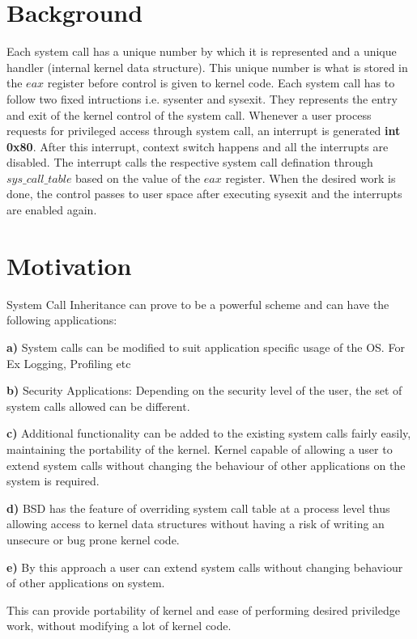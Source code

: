 \documentclass[11pt]{article}
\begin{document}
\section{Background}

Each system call has a unique number by which it is represented and a unique handler (internal kernel data structure).
This unique number is what is stored in the $eax$ register before control is given to kernel code. Each system call
has to follow two fixed intructions i.e. sysenter and sysexit. They represents the entry and exit of the kernel control
of the system call. Whenever a user process requests for privileged access through system call, an interrupt is
generated \textbf{int 0x80}. After this interrupt, context switch happens and all the interrupts are disabled.
The interrupt calls the respective system call defination through $sys\_call\_table$ based on the value of the $eax$
register. When the desired work is done, the control passes  to user space after executing sysexit and the
interrupts are enabled again.

\section{Motivation}

System Call Inheritance can prove to be a powerful scheme and can have the following applications: 

\medskip
\noindent
\textbf{a)} System calls can be modified to suit application specific usage of the OS. For Ex Logging, Profiling etc 

\noindent
\textbf{b)} Security Applications: Depending on the security level of the user, the set of system calls allowed can be different. 

\noindent
\textbf{c)} Additional functionality can be added to the existing system calls fairly easily, maintaining the portability of the kernel. Kernel capable of allowing a user to extend system calls without changing the behaviour of other applications on the system is required. 

\noindent
\textbf{d)} BSD has the feature of overriding system call table at a process level thus allowing access to kernel data structures without having a risk of writing an unsecure or bug prone kernel code. 

\noindent
\textbf{e)} By this approach a user can extend system calls without changing behaviour of other applications on system.

\medskip
\noindent
This can provide portability of kernel and ease of performing desired priviledge work, without modifying a lot of kernel code.
\end{document}
